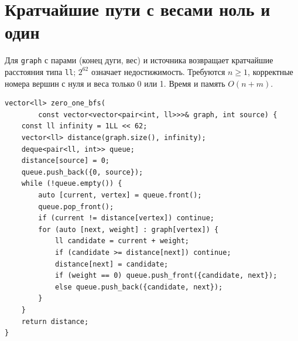 %

\section{Кратчайшие пути с весами ноль и один}
Для \texttt{graph} с парами (конец дуги, вес) и источника возвращает кратчайшие расстояния типа \texttt{ll}; $2^{62}$ означает недостижимость.
Требуются $n\ge1$, корректные номера вершин с нуля и веса только 0 или 1.
Время и память $O(n+m)$.
\begin{lstlisting}[name=extra_graph_zero_one_bfs]
vector<ll> zero_one_bfs(
        const vector<vector<pair<int, ll>>>& graph, int source) {
    const ll infinity = 1LL << 62;
    vector<ll> distance(graph.size(), infinity);
    deque<pair<ll, int>> queue;
    distance[source] = 0;
    queue.push_back({0, source});
    while (!queue.empty()) {
        auto [current, vertex] = queue.front();
        queue.pop_front();
        if (current != distance[vertex]) continue;
        for (auto [next, weight] : graph[vertex]) {
            ll candidate = current + weight;
            if (candidate >= distance[next]) continue;
            distance[next] = candidate;
            if (weight == 0) queue.push_front({candidate, next});
            else queue.push_back({candidate, next});
        }
    }
    return distance;
}
\end{lstlisting}
%

